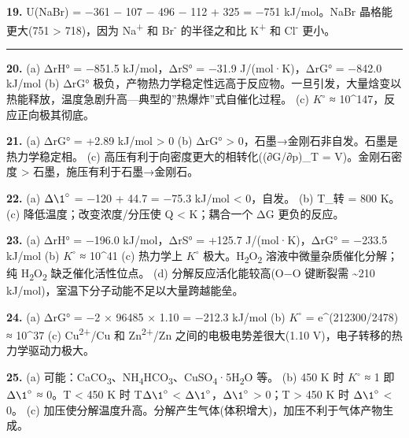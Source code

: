 \textbf{19.} U(NaBr) = −361 − 107 − 496 − 112 + 325 = −751 kJ/mol。NaBr 晶格能更大(751 \textgreater{} 718)，因为 Na\textsuperscript{+} 和 Br\textsuperscript{-} 的半径之和比 K\textsuperscript{+} 和 Cl\textsuperscript{-} 更小。

\begin{center}\rule{0.5\linewidth}{0.5pt}\end{center}

\textbf{20.}
(a) ΔrH° = −851.5 kJ/mol，ΔrS° = −31.9 J/(mol·K)，ΔrG° = −842.0 kJ/mol
(b) ΔrG° 极负，产物热力学稳定性远高于反应物。一旦引发，大量焓变以热能释放，温度急剧升高---典型的''热爆炸''式自催化过程。
(c) \(K^{\circ}\) ≈ 10\^{}147，反应正向极其彻底。

\textbf{21.}
(a) ΔrG° = +2.89 kJ/mol \textgreater{} 0
(b) ΔrG° \textgreater{} 0，石墨→金刚石非自发。石墨是热力学稳定相。
(c) 高压有利于向密度更大的相转化((∂G/∂p)\_T = V)。金刚石密度 \textgreater{} 石墨，施压有利于石墨→金刚石。

\textbf{22.}
(a) \(\Delta \1^{\circ}\) = −120 + 44.7 = −75.3 kJ/mol \textless{} 0，自发。
(b) T\_转 = 800 K。
(c) 降低温度；改变浓度/分压使 Q \textless{} K；耦合一个 ΔG 更负的反应。

\textbf{23.}
(a) ΔrH° = −196.0 kJ/mol，ΔrS° = +125.7 J/(mol·K)，ΔrG° = −233.5 kJ/mol
(b) \(K^{\circ}\) ≈ 10\^{}41
(c) 热力学上 \(K^{\circ}\) 极大。H\textsubscript{2}O\textsubscript{2} 溶液中微量杂质催化分解；纯 H\textsubscript{2}O\textsubscript{2} 缺乏催化活性位点。
(d) 分解反应活化能较高(O−O 键断裂需 \textasciitilde210 kJ/mol)，室温下分子动能不足以大量跨越能垒。

\textbf{24.}
(a) ΔrG° = −2 × 96485 × 1.10 = −212.3 kJ/mol
(b) \(K^{\circ}\) = e\^{}(212300/2478) ≈ 10\^{}37
(c) Cu\textsuperscript{2+}/Cu 和 Zn\textsuperscript{2+}/Zn 之间的电极电势差很大(1.10 V)，电子转移的热力学驱动力极大。

\textbf{25.}
(a) 可能：CaCO\textsubscript{3}、NH\textsubscript{4}HCO\textsubscript{3}、CuSO\textsubscript{4}·5H\textsubscript{2}O 等。
(b) 450 K 时 \(K^{\circ}\) ≈ 1 即 \(\Delta \1^{\circ}\) ≈ 0。T \textless{} 450 K 时 T\(\Delta \1^{\circ}\) \textless{} \(\Delta \1^{\circ}\)，\(\Delta \1^{\circ}\) \textgreater{} 0；T \textgreater{} 450 K 时 \(\Delta \1^{\circ}\) \textless{} 0。
(c) 加压使分解温度升高。分解产生气体(体积增大)，加压不利于气体产物生成。
